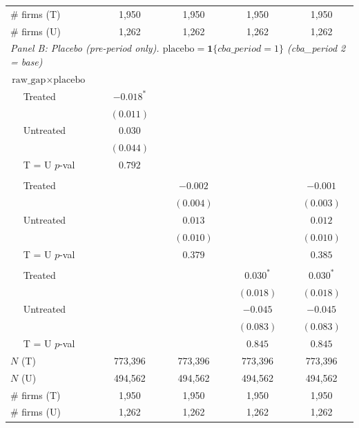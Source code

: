 \begin{table}[H]
\begin{tabular}{lcccc}
\# firms (T) & 1,950 & 1,950 & 1,950 & 1,950 \\
\# firms (U) & 1,262 & 1,262 & 1,262 & 1,262 \\
\midrule
\multicolumn{5}{l}{\textit{Panel B: Placebo (pre-period only). $\text{placebo} = \mathbf{1}\{cba\_period = 1\}$ (cba\_period 2 = base)}} \\
\midrule
\multicolumn{5}{l}{$\text{raw\_gap} \times \text{placebo}$} \\
$\quad$ Treated & $-0.018^{*}$ &  &  &  \\
 & $(0.011)$ &  &  &  \\
$\quad$ Untreated & $0.030$ &  &  &  \\
 & $(0.044)$ &  &  &  \\
$\quad$ T = U $p$-val & $0.792$ &  &  &  \\
\addlinespace[2pt]
\multicolumn{5}{l}{$\text{gap} \times \text{placebo}$} \\
$\quad$ Treated &  & $-0.002$ &  & $-0.001$ \\
 &  & $(0.004)$ &  & $(0.003)$ \\
$\quad$ Untreated &  & $0.013$ &  & $0.012$ \\
 &  & $(0.010)$ &  & $(0.010)$ \\
$\quad$ T = U $p$-val &  & $0.379$ &  & $0.385$ \\
\addlinespace[2pt]
\multicolumn{5}{l}{$\text{surplus} \times \text{placebo}$} \\
$\quad$ Treated &  &  & $0.030^{*}$ & $0.030^{*}$ \\
 &  &  & $(0.018)$ & $(0.018)$ \\
$\quad$ Untreated &  &  & $-0.045$ & $-0.045$ \\
 &  &  & $(0.083)$ & $(0.083)$ \\
$\quad$ T = U $p$-val &  &  & $0.845$ & $0.845$ \\
\addlinespace[2pt]
$N$ (T) & 773,396 & 773,396 & 773,396 & 773,396 \\
$N$ (U) & 494,562 & 494,562 & 494,562 & 494,562 \\
\# firms (T) & 1,950 & 1,950 & 1,950 & 1,950 \\
\# firms (U) & 1,262 & 1,262 & 1,262 & 1,262 \\
\bottomrule
\end{tabular}
\begin{minipage}{\linewidth}
\footnotesize\vspace{4pt}

\end{minipage}
\end{table}
